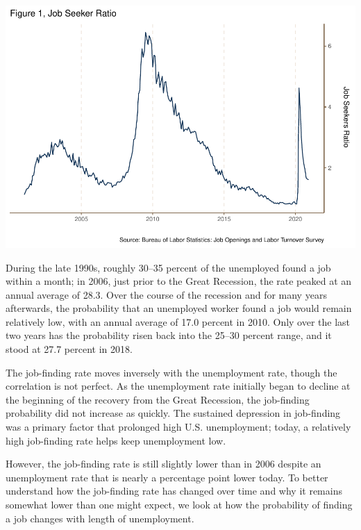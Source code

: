 \documentclass[
  11pt,
]{article}
\begin{document}
\begin{center}\includegraphics{JOLTS_files/figure-latex/unnamed-chunk-5-1} \end{center}

During the late 1990s, roughly 30--35 percent of the unemployed found a
job within a month; in 2006, just prior to the Great Recession, the rate
peaked at an annual average of 28.3. Over the course of the recession
and for many years afterwards, the probability that an unemployed worker
found a job would remain relatively low, with an annual average of 17.0
percent in 2010. Only over the last two years has the probability risen
back into the 25--30 percent range, and it stood at 27.7 percent in
2018.

The job-finding rate moves inversely with the unemployment rate, though
the correlation is not perfect. As the unemployment rate initially began
to decline at the beginning of the recovery from the Great Recession,
the job-finding probability did not increase as quickly. The sustained
depression in job-finding was a primary factor that prolonged high U.S.
unemployment; today, a relatively high job-finding rate helps keep
unemployment low.

However, the job-finding rate is still slightly lower than in 2006
despite an unemployment rate that is nearly a percentage point lower
today. To better understand how the job-finding rate has changed over
time and why it remains somewhat lower than one might expect, we look at
how the probability of finding a job changes with length of
unemployment.
\end{document}
